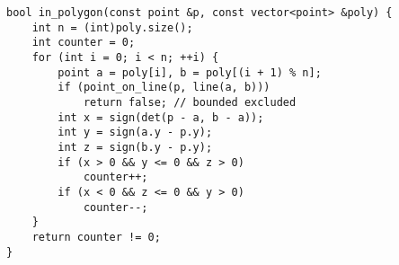 \begin{lstlisting}
bool in_polygon(const point &p, const vector<point> &poly) {
	int n = (int)poly.size();
	int counter = 0;
	for (int i = 0; i < n; ++i) {
		point a = poly[i], b = poly[(i + 1) % n];
		if (point_on_line(p, line(a, b)))
			return false; // bounded excluded
		int x = sign(det(p - a, b - a));
		int y = sign(a.y - p.y);
		int z = sign(b.y - p.y);
		if (x > 0 && y <= 0 && z > 0)
			counter++;
		if (x < 0 && z <= 0 && y > 0)
			counter--;
	}
	return counter != 0;
}
\end{lstlisting}

